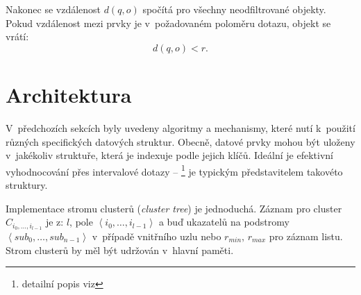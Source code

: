 Nakonec se vzdálenost $d(q,o)$ spočítá pro všechny neodfiltrované objekty. Pokud vzdálenost mezi prvky je v~požadovaném poloměru dotazu, objekt se vrátí:
\[
d(q,o) < r.
\]
\section{Architektura }

V~předchozích sekcích byly uvedeny algoritmy a mechanismy, které
nutí k~použití různých specifických datových struktur\@. Obecně,
datové prvky mohou být uloženy v~jakékoliv struktuře, která je indexuje
podle jejich \MIndex{} klíčů. Ideální je efektivní vyhodnocování přes
intervalové dotazy -- \BPTree{}\cite{Cormen:2001:IA:580470}%
\footnote{detailní popis \BPTree{} viz %
} je typickým představitelem takovéto struktury\@.

Implementace stromu clusterů (\emph{cluster tree}) je jednoduchá\@.
Záznam pro cluster $C_{i_{0},\ldots,i_{l-1}}$ je z: $l$, pole $\left\langle i_{0},\ldots,i_{l-1}\right\rangle $
a buď ukazatelů na podstromy $\left\langle sub_{0},\ldots,sub_{n-1}\right\rangle $
v~případě vnitřního uzlu nebo $r_{min},\, r_{max}$ pro záznam listu\@.
Strom clusterů by měl být udržován v~hlavní paměti.
